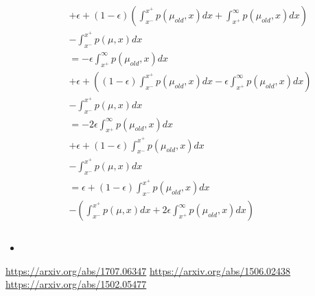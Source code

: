 \documentclass[a4paper]{article}
\begin{document}
\begin{itemize}
\begin{align*}
        &+
        \epsilon
        + 
        (1 - \epsilon)
        \left(
        \int_{x^{-}}^{x^{+}}p(\mu_{old}, x)dx
        +
        \int_{x^{+}}^{\infty}p(\mu_{old}, x)dx
        \right)\\
        &- 
        \int_{x^{-}}^{x^{+}}p(\mu, x)dx 
        \\
        &=
        -\epsilon
        \int_{x^{+}}^{\infty}p(\mu_{old}, x)dx\\
        &+
        \epsilon
        + 
        \left(
        (1 - \epsilon)
        \int_{x^{-}}^{x^{+}}p(\mu_{old}, x)dx
        - \epsilon
        \int_{x^{+}}^{\infty}p(\mu_{old}, x)dx
        \right)\\
        &- 
        \int_{x^{-}}^{x^{+}}p(\mu, x)dx 
        \\
        &=
        -2\epsilon
        \int_{x^{+}}^{\infty}p(\mu_{old}, x)dx\\
        &+
        \epsilon
        + 
        (1 - \epsilon)
        \int_{x^{-}}^{x^{+}}p(\mu_{old}, x)dx
        \\
        &- 
        \int_{x^{-}}^{x^{+}}p(\mu, x)dx 
        \\
        &=
        \epsilon
        + 
        (1 - \epsilon)
        \int_{x^{-}}^{x^{+}}p(\mu_{old}, x)dx
        \\
        &-\left(\int_{x^{-}}^{x^{+}}p(\mu, x)dx 
        +2\epsilon
        \int_{x^{+}}^{\infty}p(\mu_{old}, x)dx\right)\\
        \\
    \end{align*}
    
    \item

\end{itemize}

%

\newpage
\begin{thebibliography}{9}
\url{https://arxiv.org/abs/1707.06347}
\url{https://arxiv.org/abs/1506.02438}
\url{https://arxiv.org/abs/1502.05477}
\end{thebibliography}
\end{document}
